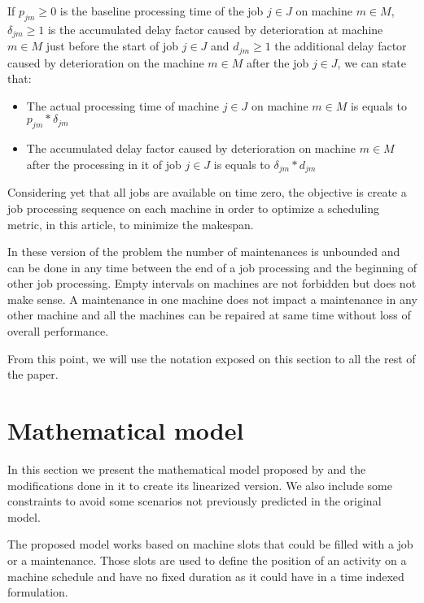 \documentclass[a4paper,11pt]{article}
\begin{document}
If $p_{jm} \geq 0 $ is the baseline processing time of the job $j \in J$ on machine $m \in M$, $\delta_{jm} \geq 1$ is the accumulated delay factor caused by deterioration at machine $m \in M$ just before the start of job $j \in J$ and $d_{jm} \geq 1$ the additional delay factor caused by deterioration on the machine $m \in M$ after the job $j \in J$, we can state that:

\begin{itemize}
\item{  The actual processing time of machine $j \in J$ on machine $m \in M$ is equals to $p_{jm}*\delta_{jm}$ }

\item{ The accumulated delay factor caused by deterioration on machine $m \in M$ after the processing in it of job $j \in J$ is equals to $\delta_{jm}*d_{jm}$}
\end{itemize}

Considering yet that all jobs are available on time zero, the objective is create a job processing sequence on each machine in order to optimize a scheduling metric, in this article, to minimize the makespan. 

In these version of the problem the number of maintenances is unbounded and can be done in any time between the end of a job processing and the beginning of other job processing. Empty intervals on machines are not forbidden but does not make sense. A maintenance in one machine does not impact a maintenance in any other machine and all the machines can be repaired at same time without loss of overall performance. 

From this point, we will use the notation exposed on this section to all the rest of the paper. 


\section{Mathematical model}

In this section we present the mathematical model proposed by \citep{ruiz2017makespan} and the modifications done in it to create its linearized version. We also include some constraints to avoid some scenarios not previously predicted in the original model.

The proposed model works based on machine slots that could be filled with a job or a maintenance. Those slots are used to define the position of an activity on a machine schedule and have no fixed duration as it could have in a time indexed formulation. 
\end{document}
